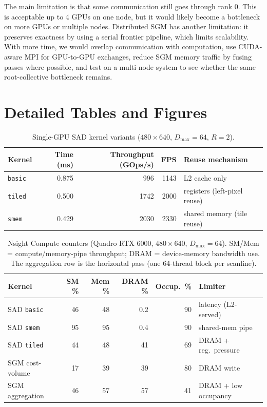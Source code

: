 \documentclass[11pt]{article}
\begin{document}
The main limitation is that some communication still goes through rank 0. This is acceptable up to 4 GPUs on one node, but it would likely become a bottleneck on more GPUs or multiple nodes. Distributed SGM has another limitation: it preserves exactness by using a serial frontier pipeline, which limits scalability. With more time, we would overlap communication with computation, use CUDA-aware MPI for GPU-to-GPU exchanges, reduce SGM memory traffic by fusing passes where possible, and test on a multi-node system to see whether the same root-collective bottleneck remains.


\appendix
\section{Detailed Tables and Figures}
\label{app:tables}

\begin{table}[H]
\centering
\caption{Single-GPU SAD kernel variants ($480\times640$, $D_{\max}=64$, $R=2$).}
\label{tab:kernels}
\begin{tabular}{lrrrl}
\toprule
Kernel & Time (ms) & Throughput (GOps/s) & FPS & Reuse mechanism\\
\midrule
\texttt{basic} & 0.875 & \phantom{0}996 & 1143 & L2 cache only \\
\texttt{tiled} & 0.500 & 1742 & 2000 & registers (left-pixel reuse) \\
\texttt{smem}  & 0.429 & 2030 & 2330 & shared memory (tile reuse) \\
\bottomrule
\end{tabular}
\end{table}

\begin{table}[H]
\centering
\caption{Nsight Compute counters (Quadro RTX 6000, $480\times640$, $D_{\max}{=}64$).
SM/Mem = compute/memory-pipe throughput; DRAM = device-memory bandwidth use. The
aggregation row is the horizontal pass (one 64-thread block per scanline).}
\label{tab:ncu}
\begin{tabular}{lrrrrl}
\toprule
Kernel & SM \% & Mem \% & DRAM \% & Occup.\ \% & Limiter\\
\midrule
SAD \texttt{basic} & 46 & 48 & \phantom{0}0.2 & 90 & latency (L2-served)\\
SAD \texttt{smem}  & 95 & 95 & \phantom{0}0.4 & 90 & shared-mem pipe\\
SAD \texttt{tiled} & 44 & 48 & 41 & 69 & DRAM + reg.\ pressure\\
SGM cost-volume    & 17 & 39 & 39 & 80 & DRAM write\\
SGM aggregation    & 46 & 57 & 57 & 41 & DRAM + low occupancy\\
\bottomrule
\end{tabular}
\end{table}
\end{document}

